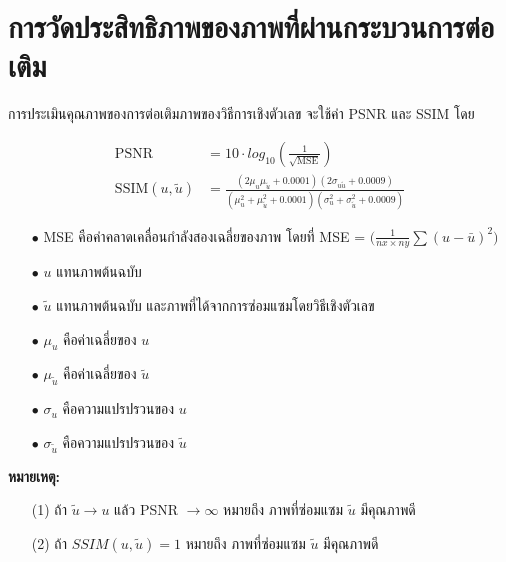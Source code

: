 	\section{การวัดประสิทธิภาพของภาพที่ผ่านกระบวนการต่อเติม}
	
	\hspace{1cm} การประเมินคุณภาพของการต่อเติมภาพของวิธีการเชิงตัวเลข จะใช้ค่า PSNR \cite{ref:PSNR} และ SSIM \cite{ref:SSIM} โดย
	
	\begin{align*}
		 \text{PSNR}  &= 10 \cdot log_{10} ( \frac{1}{\sqrt{\text{MSE}}} ) \\
		\text{SSIM}(u,\tilde{u}) &= \frac{(2\mu_u\mu_{\tilde{u}} + 0.0001)(2\sigma_{u\tilde{u}} + 0.0009)}{(\mu_u^2+\mu_{\tilde{u}}^2+0.0001)(\sigma_u^2+\sigma_{\tilde{u}}^2+0.0009)}
	\end{align*}
	
	\begin{itemize}
		\item[$\bullet$] MSE คือค่าคลาดเคลื่อนกำลังสองเฉลี่ยของภาพ โดยที่ MSE = $\bigg( \frac{1}{nx \times ny} \sum (u - \bar{u})^2  \bigg)$
		\item[$\bullet$] $u$ แทนภาพต้นฉบับ
		\item[$\bullet$] $\tilde{u}$  แทนภาพต้นฉบับ และภาพที่ได้จากการซ่อมแซมโดยวิธีเชิงตัวเลข
		\item[$\bullet$] $\mu_u$ คือค่าเฉลี่ยของ $u$
		\item[$\bullet$] $\mu_{\tilde{u}}$ คือค่าเฉลี่ยของ $\tilde{u}$
		\item[$\bullet$]  $\sigma_u$ คือความแปรปรวนของ $u$ 
		\item[$\bullet$] $\sigma_{\tilde{u}}$ คือความแปรปรวนของ $\tilde{u}$
	\end{itemize}
	
	\textbf{หมายเหตุ:}
	\begin{itemize}
		\item [(1)] ถ้า $\tilde{u} \longrightarrow u $ แล้ว PSNR $\longrightarrow \infty$ หมายถึง ภาพที่ซ่อมแซม $\tilde{u}$ มีคุณภาพดี
		\item [(2)] ถ้า $SSIM(u,\tilde{u}) = 1 $
		หมายถึง ภาพที่ซ่อมแซม $\tilde{u}$ มีคุณภาพดี
	\end{itemize}
	

\clearpage